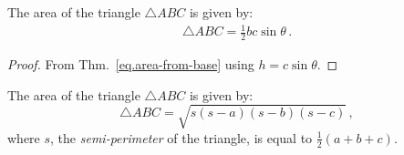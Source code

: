 \begin{theorem} The area of the triangle $\triangle ABC$ is given by:
\begin{align}\label{eq.area-from-sine}
\triangle ABC = \frac{1}{2}bc\sin \theta\,.
\end{align}
\end{theorem}
\begin{proof} From Thm.~\ref{eq.area-from-base} using
$h=c\sin \theta$.
\end{proof}



\begin{theorem}[Heron] The area of the triangle $\triangle ABC$ is given by:\label{thm.heron} 
\[
\triangle ABC = \sqrt{s(s-a)(s-b)(s-c)}\,,
\]
where $s$, the \emph{semi-perimeter} of the triangle, is equal to  $\frac{1}{2}(a+b+c)$.
\end{theorem}

